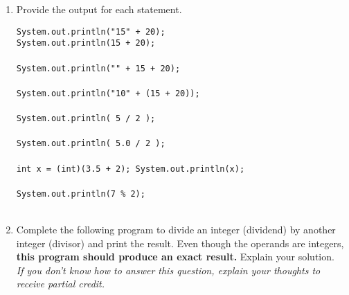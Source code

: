 \Instructions
\begin{enumerate}
\item {}
Provide the output for each statement.

\begin{oneparchoices} 
\hspace{0.2cm}
\vspace{2em} 
 \choice \texttt{System.out.println("15" + 20);} 
 \\
 
 \choice \texttt{System.out.println(15 + 20);}  \vspace{1em}
 \\ \\

 \choice \texttt{System.out.println("" + 15 + 20);} \vspace{1em}
 \\ \\
 
  \choice \texttt{System.out.println("10" + (15 + 20));} \vspace{1em}
 \\ \\

 \choice \texttt{System.out.println( 5 / 2 );} \vspace{1em}
 \\ \\
    
 \choice \texttt{System.out.println( 5.0 / 2 );} \vspace{1em}
 \\ \\
 
  \choice \texttt{int x = (int)(3.5 + 2); System.out.println(x);} \vspace{1em}
 \\ \\
    
\choice \texttt{System.out.println(7 \% 2);} \vspace{1em}
 \\ \\
    

 \end{oneparchoices}
 
 \item {}
Complete the following program to divide an integer (dividend) by another integer (divisor) and print the result. Even though the operands are integers, \textbf{this program should produce an exact result.} Explain your solution.
\\
\textit{If you don't know how to answer this question, explain your thoughts to receive partial credit.}


\end{enumerate}
